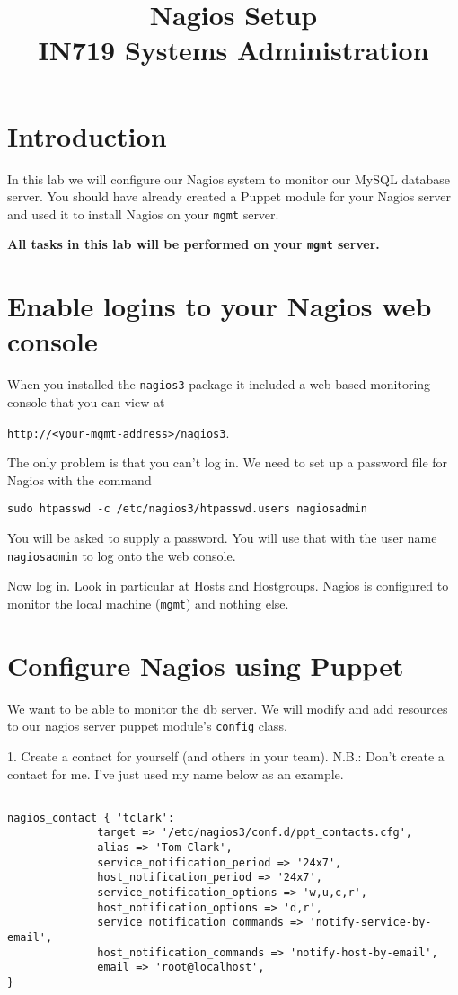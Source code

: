 \documentclass{article}         %
\title{Nagios Setup\\ IN719 Systems Administration}
\date{}                                                 %
\begin{document}
\maketitle

\section*{Introduction}
In this lab we will configure our Nagios system to monitor our MySQL
database server.  You should have already created a Puppet module
for your Nagios server and used it to install Nagios on your 
\texttt{mgmt} server.

\textbf{All tasks in this lab will be performed on your \texttt{mgmt} server.}

\section{Enable logins to your Nagios web console}
When you installed the \texttt{nagios3} package it included a web based 
monitoring console that you can view at

\texttt{http://<your-mgmt-address>/nagios3}.

The only problem is that you can't log in.  We need to set up a password file
for Nagios with the command

 \texttt{sudo htpasswd -c /etc/nagios3/htpasswd.users nagiosadmin}

You will be asked to supply a password.  You will use that with the 
user name \texttt{nagiosadmin} to log onto the web console.

Now log in.  Look in particular at Hosts and Hostgroups.  Nagios is configured
to monitor the local machine (\texttt{mgmt}) and nothing else.

\section{Configure Nagios using Puppet}

We want to be able to monitor the db server.  We will modify and add resources to
our nagios server puppet module's \texttt{config} class. 

1.  Create a contact for yourself (and others in your team). N.B.: Don't 
create a contact for me. I've just used my name below as an example.

\begin{verbatim}

nagios_contact { 'tclark':
              target => '/etc/nagios3/conf.d/ppt_contacts.cfg',
              alias => 'Tom Clark',
              service_notification_period => '24x7',
              host_notification_period => '24x7',
              service_notification_options => 'w,u,c,r',
              host_notification_options => 'd,r',
              service_notification_commands => 'notify-service-by-email',
              host_notification_commands => 'notify-host-by-email',
              email => 'root@localhost',
}

  \end{verbatim}
\end{document}

